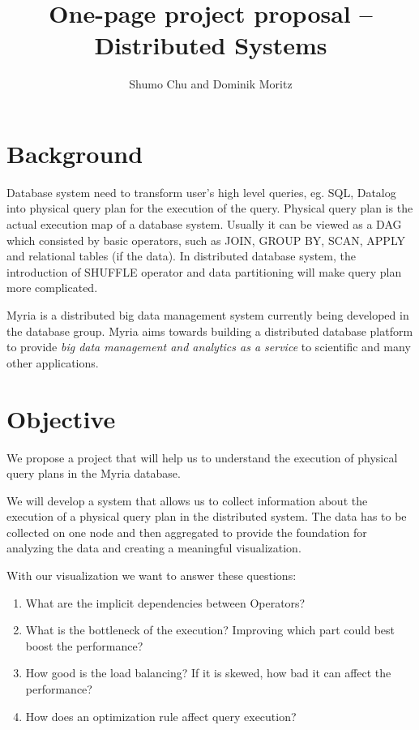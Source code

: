 \documentclass[11pt]{article}
\begin{document}

\title{One-page project proposal \--- Distributed Systems}
\author{Shumo Chu and Dominik Moritz}
\date{}

\maketitle

\section*{Background}

Database system need to transform user's high level queries, eg. SQL, Datalog into physical query plan for the execution of the query. Physical query plan is the actual execution map of a database system. Usually it can be viewed as a DAG which consisted by basic operators, such as JOIN, GROUP BY, SCAN, APPLY and relational tables (if the data). In distributed database system, the introduction of SHUFFLE operator and data partitioning will make query plan more complicated.

Myria is a distributed big data management system currently being developed in the database group. Myria aims towards building a distributed database platform to provide \emph{big data management and analytics as a service} to scientific and many other applications. 

\section*{Objective}

We propose a project that will help us to understand the execution of physical query plans in the Myria database.

We will develop a system that allows us to collect information about the execution of a physical query plan in the distributed system. The data has to be collected on one node and then aggregated to provide the foundation for analyzing the data and creating a meaningful visualization.

With our visualization we want to answer these questions:

\begin{enumerate}
	\item What are the implicit dependencies between Operators?
	\item What is the bottleneck of the execution? Improving which part could best boost the performance?
	\item How good is the load balancing? If it is skewed, how bad it can affect the performance?
	\item How does an optimization rule affect query execution?
\end{enumerate}
\end{document}

